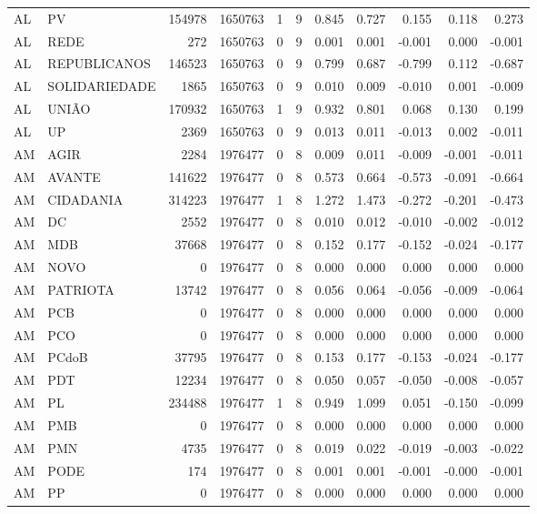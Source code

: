 \begin{landscape}
\begin{longtable}{llrrrrrrrrr}
AL & PV & 154978 & 1650763 & 1 & 9 & 0.845 & 0.727 & 0.155 & 0.118 & 0.273 \\
AL & REDE & 272 & 1650763 & 0 & 9 & 0.001 & 0.001 & -0.001 & 0.000 & -0.001 \\
AL & REPUBLICANOS & 146523 & 1650763 & 0 & 9 & 0.799 & 0.687 & -0.799 & 0.112 & -0.687 \\
AL & SOLIDARIEDADE & 1865 & 1650763 & 0 & 9 & 0.010 & 0.009 & -0.010 & 0.001 & -0.009 \\
AL & UNIÃO & 170932 & 1650763 & 1 & 9 & 0.932 & 0.801 & 0.068 & 0.130 & 0.199 \\
AL & UP & 2369 & 1650763 & 0 & 9 & 0.013 & 0.011 & -0.013 & 0.002 & -0.011 \\
AM & AGIR & 2284 & 1976477 & 0 & 8 & 0.009 & 0.011 & -0.009 & -0.001 & -0.011 \\
AM & AVANTE & 141622 & 1976477 & 0 & 8 & 0.573 & 0.664 & -0.573 & -0.091 & -0.664 \\
AM & CIDADANIA & 314223 & 1976477 & 1 & 8 & 1.272 & 1.473 & -0.272 & -0.201 & -0.473 \\
AM & DC & 2552 & 1976477 & 0 & 8 & 0.010 & 0.012 & -0.010 & -0.002 & -0.012 \\
AM & MDB & 37668 & 1976477 & 0 & 8 & 0.152 & 0.177 & -0.152 & -0.024 & -0.177 \\
AM & NOVO & 0 & 1976477 & 0 & 8 & 0.000 & 0.000 & 0.000 & 0.000 & 0.000 \\
AM & PATRIOTA & 13742 & 1976477 & 0 & 8 & 0.056 & 0.064 & -0.056 & -0.009 & -0.064 \\
AM & PCB & 0 & 1976477 & 0 & 8 & 0.000 & 0.000 & 0.000 & 0.000 & 0.000 \\
AM & PCO & 0 & 1976477 & 0 & 8 & 0.000 & 0.000 & 0.000 & 0.000 & 0.000 \\
AM & PCdoB & 37795 & 1976477 & 0 & 8 & 0.153 & 0.177 & -0.153 & -0.024 & -0.177 \\
AM & PDT & 12234 & 1976477 & 0 & 8 & 0.050 & 0.057 & -0.050 & -0.008 & -0.057 \\
AM & PL & 234488 & 1976477 & 1 & 8 & 0.949 & 1.099 & 0.051 & -0.150 & -0.099 \\
AM & PMB & 0 & 1976477 & 0 & 8 & 0.000 & 0.000 & 0.000 & 0.000 & 0.000 \\
AM & PMN & 4735 & 1976477 & 0 & 8 & 0.019 & 0.022 & -0.019 & -0.003 & -0.022 \\
AM & PODE & 174 & 1976477 & 0 & 8 & 0.001 & 0.001 & -0.001 & -0.000 & -0.001 \\
AM & PP & 0 & 1976477 & 0 & 8 & 0.000 & 0.000 & 0.000 & 0.000 & 0.000 \\

\end{longtable}
\end{landscape}
